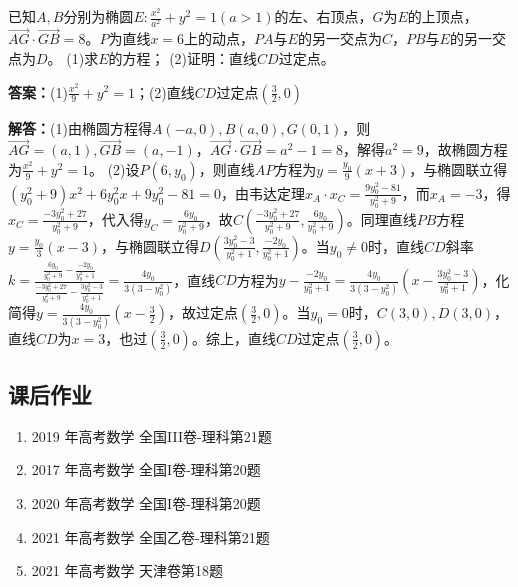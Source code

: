 \documentclass[UTF8,a4paper,11pt]{ctexart}
\begin{document}
已知$A,B$分别为椭圆$E:\frac{x^2}{a^2}+y^2=1(a>1)$的左、右顶点，$G$为$E$的上顶点，$\overrightarrow{AG}\cdot\overrightarrow{GB}=8$。$P$为直线$x=6$上的动点，$PA$与$E$的另一交点为$C$，$PB$与$E$的另一交点为$D$。
(1)求$E$的方程；
(2)证明：直线$CD$过定点。

\textbf{答案：}(1)$\frac{x^2}{9}+y^2=1$；(2)直线$CD$过定点$\left(\frac{3}{2},0\right)$\par

\textbf{解答：}(1)由椭圆方程得$A(-a,0),B(a,0),G(0,1)$，则$\overrightarrow{AG}=(a,1),\overrightarrow{GB}=(a,-1)$，$\overrightarrow{AG}\cdot\overrightarrow{GB}=a^2-1=8$，解得$a^2=9$，故椭圆方程为$\frac{x^2}{9}+y^2=1$。
(2)设$P(6,y_0)$，则直线$AP$方程为$y=\frac{y_0}{9}(x+3)$，与椭圆联立得$(y_0^2+9)x^2+6y_0^2x+9y_0^2-81=0$，由韦达定理$x_A\cdot x_C=\frac{9y_0^2-81}{y_0^2+9}$，而$x_A=-3$，得$x_C=\frac{-3y_0^2+27}{y_0^2+9}$，代入得$y_C=\frac{6y_0}{y_0^2+9}$，故$C\left(\frac{-3y_0^2+27}{y_0^2+9},\frac{6y_0}{y_0^2+9}\right)$。同理直线$PB$方程$y=\frac{y_0}{3}(x-3)$，与椭圆联立得$D\left(\frac{3y_0^2-3}{y_0^2+1},\frac{-2y_0}{y_0^2+1}\right)$。当$y_0\neq0$时，直线$CD$斜率$k=\frac{\frac{6y_0}{y_0^2+9}-\frac{-2y_0}{y_0^2+1}}{\frac{-3y_0^2+27}{y_0^2+9}-\frac{3y_0^2-3}{y_0^2+1}}=\frac{4y_0}{3(3-y_0^2)}$，直线$CD$方程为$y-\frac{-2y_0}{y_0^2+1}=\frac{4y_0}{3(3-y_0^2)}\left(x-\frac{3y_0^2-3}{y_0^2+1}\right)$，化简得$y=\frac{4y_0}{3(3-y_0^2)}\left(x-\frac{3}{2}\right)$，故过定点$\left(\frac{3}{2},0\right)$。当$y_0=0$时，$C(3,0),D(3,0)$，直线$CD$为$x=3$，也过$\left(\frac{3}{2},0\right)$。综上，直线$CD$过定点$\left(\frac{3}{2},0\right)$。

\subsection*{课后作业}

\begin{enumerate}

\item 2019 年高考数学 全国III卷-理科第21题

\item 2017 年高考数学 全国I卷-理科第20题

\item 2020 年高考数学 全国I卷-理科第20题

\item 2021 年高考数学 全国乙卷-理科第21题

\item 2021 年高考数学 天津卷第18题

\end{enumerate}
\end{document}
